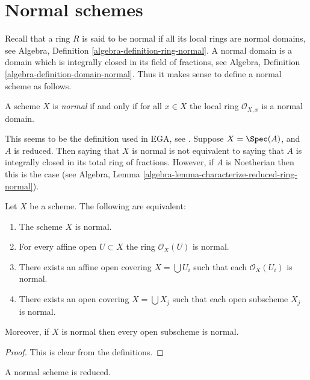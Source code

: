 \section{Normal schemes}
\label{section-normal}

\noindent
Recall that a ring $R$ is said to be normal if all its local rings
are normal domains,
see Algebra, Definition \ref{algebra-definition-ring-normal}.
A normal domain is a domain which is integrally closed in its field
of fractions, see
Algebra, Definition \ref{algebra-definition-domain-normal}.
Thus it makes sense to define a normal scheme as follows.

\begin{definition}
\label{definition-normal}
A scheme $X$ is {\it normal} if and only if for all $x \in X$ the local ring
$\mathcal{O}_{X, x}$ is a normal domain.
\end{definition}

\noindent
This seems to be the definition used in EGA, see \cite[0, 4.1.4]{EGA}.
Suppose $X = \Spec(A)$, and $A$ is reduced. Then saying that $X$ is
normal is not equivalent to saying that $A$ is integrally closed in its
total ring of fractions. However, if $A$ is Noetherian then this is the case
(see Algebra, Lemma \ref{algebra-lemma-characterize-reduced-ring-normal}).

\begin{lemma}
\label{lemma-locally-normal}
Let $X$ be a scheme. The following are equivalent:
\begin{enumerate}
\item The scheme $X$ is normal.
\item For every affine open $U \subset X$ the ring $\mathcal{O}_X(U)$
is normal.
\item There exists an affine open covering $X = \bigcup U_i$ such that
each $\mathcal{O}_X(U_i)$ is normal.
\item There exists an open covering $X = \bigcup X_j$
such that each open subscheme $X_j$ is normal.
\end{enumerate}
Moreover, if $X$ is normal then every open subscheme
is normal.
\end{lemma}

\begin{proof}
This is clear from the definitions.
\end{proof}

\begin{lemma}
\label{lemma-normal-reduced}
A normal scheme is reduced.
\end{lemma}

